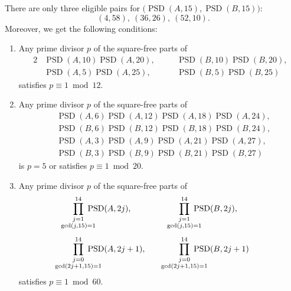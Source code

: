 \documentclass{article}
\theoremstyle{definition}
\newcommand{\ck}[1]{{\color{red} #1}}
\newcommand{\DFT}{\operatorname{DFT}}
\newcommand{\PSD}{\operatorname{PSD}}
\begin{document}
There are only three eligible pairs for $\bigl(\PSD(A,15),\PSD(B,15)\bigr)$:
$$(4,58),\ (36,26),\ (52,10).$$
Moreover, we get the following conditions:
\begin{enumerate}
\item Any prime divisor $p$ of the square-free parts of 
\begin{alignat*}{2}
  & \PSD(A,10)\PSD(A,20), &\quad& \PSD(B,10)\PSD(B,20), \\
  & \PSD(A,5)\PSD(A,25), && \PSD(B,5)\PSD(B,25)
\end{alignat*}
satisfies $p\equiv 1\bmod 12$.

\item Any prime divisor $p$ of the square-free parts of
\begin{align*}
  & \PSD(A,6)\PSD(A,12)\PSD(A,18)\PSD(A,24), \\
  & \PSD(B,6)\PSD(B,12)\PSD(B,18)\PSD(B,24), \\
  & \PSD(A,3)\PSD(A,9)\PSD(A,21)\PSD(A,27), \\
  & \PSD(B,3)\PSD(B,9)\PSD(B,21)\PSD(B,27)
\end{align*}
is $p=5$ or satisfies $p\equiv 1\bmod 20$.

\item Any prime divisor $p$ of the square-free parts of
\begin{alignat*}{2}
 &  \alprod{\textstyle\genfrac{}{}{0pt}{}{j=1}{\gcd(j,15)=1}}^{14}\ \PSD(A,2j),
 && \alprod{\textstyle\genfrac{}{}{0pt}{}{j=1}{\gcd(j,15)=1}}^{14}\ \PSD(B,2j),
 \\[1ex]
 &  \alprod{\textstyle\genfrac{}{}{0pt}{}{j=0}{\gcd(2j+1,15)=1}}^{14}\ \PSD(A,2j+1),
 \kern30pt
 && \alprod{\textstyle\genfrac{}{}{0pt}{}{j=0}{\gcd(2j+1,15)=1}}^{14}\ \PSD(B,2j+1)
\end{alignat*}
satisfies $p\equiv 1\bmod 60$.
\end{enumerate}

\end{document}
